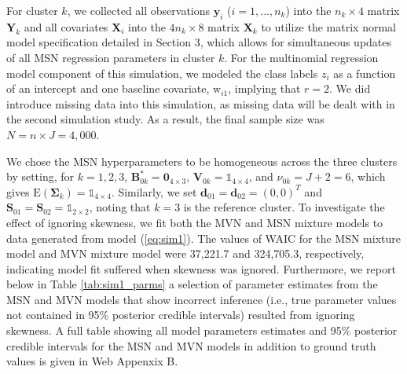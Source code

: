 \documentclass[useAMS,referee]{biom}
\begin{document}
For cluster $k$, we collected all observations $\mathbf{y}_i$ ($i = 1,...,n_k$) into the $n_k \times 4$ matrix $\mathbf{Y}_k$ and all covariates $\mathbf{X}_i$ into the $4n_k \times 8$ matrix $\mathbf{X}_k$ to utilize the matrix normal model specification detailed in Section 3, which allows for simultaneous updates of all MSN regression parameters in cluster $k$. For the multinomial regression model component of this simulation, we modeled the class labels $z_i$ as a function of an intercept and one baseline covariate, $\text{w}_{i1}$, implying that $r = 2$. We did introduce missing data into this simulation, as missing data will be dealt with in the second simulation study. As a result, the final sample size was $N = n \times J = 4,000$.

We chose the MSN hyperparameters to be homogeneous across the three clusters by setting, for $k = 1,2,3$, $\mathbf{B}_{0k}^* = \mathbf{0}_{4 \times 3}$, $\mathbf{V}_{0k} = \mathds{1}_{4 \times 4}$, and $\nu_{0k} = J + 2 = 6$, which gives $\text{E}(\boldsymbol\Sigma_k) = \mathds{1}_{4 \times 4}$. Similarly, we set $\mathbf{d}_{01} = \mathbf{d}_{02} = (0,0)^T$ and $\mathbf{S}_{01} = \mathbf{S}_{02} = \mathds{1}_{2 \times 2}$, noting that $k = 3$ is the reference cluster. To investigate the effect of ignoring skewness, we fit both the MVN and MSN mixture models to data generated from model (\ref{eq:sim1}). The values of WAIC for the MSN mixture model and MVN mixture model were 37,221.7 and 324,705.3, respectively, indicating model fit suffered when skewness was ignored. Furthermore, we report below in Table \ref{tab:sim1_parms} a selection of parameter estimates from the MSN and MVN models that show incorrect inference (i.e., true parameter values not contained in 95\% posterior credible intervals) resulted from ignoring skewness. A full table showing all model parameters estimates and 95\% posterior credible intervals for the MSN and MVN models in addition to ground truth values is given in Web Appenxix B.
\end{document}
